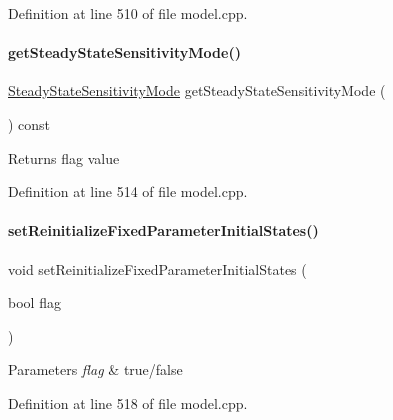 Definition at line 510 of file model.\+cpp.

\mbox{\label{classamici_1_1_model_abe272de7f41f621d27d169f7918ecac3}} 
\paragraph{\texorpdfstring{getSteadyStateSensitivityMode()}{getSteadyStateSensitivityMode()}}
{\footnotesize\ttfamily \mbox{\hyperlink{namespaceamici_a1f7d44f04185d57423d01d47d13470a6}{Steady\+State\+Sensitivity\+Mode}} get\+Steady\+State\+Sensitivity\+Mode (\begin{DoxyParamCaption}{ }\end{DoxyParamCaption}) const}

\begin{DoxyReturn}{Returns}
flag value 
\end{DoxyReturn}


Definition at line 514 of file model.\+cpp.

\mbox{\label{classamici_1_1_model_aaf26e3d4c8b574bc7e63f8beea677bcb}} 
\paragraph{\texorpdfstring{setReinitializeFixedParameterInitialStates()}{setReinitializeFixedParameterInitialStates()}}
{\footnotesize\ttfamily void set\+Reinitialize\+Fixed\+Parameter\+Initial\+States (\begin{DoxyParamCaption}\item[{bool}]{flag }\end{DoxyParamCaption})}


\begin{DoxyParams}{Parameters}
{\em flag} & true/false \\
\hline
\end{DoxyParams}


Definition at line 518 of file model.\+cpp.

